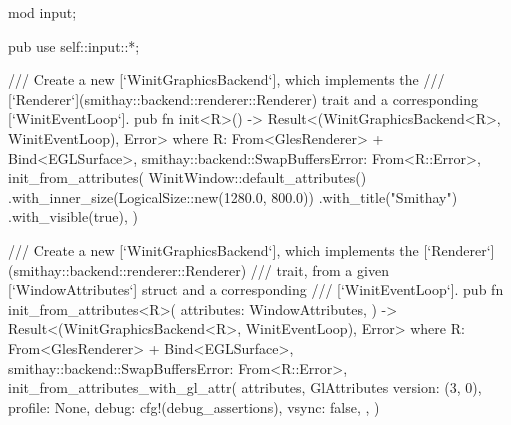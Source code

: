 mod input;

pub use self::input::*;

/// Create a new [`WinitGraphicsBackend`], which implements the
/// [`Renderer`](smithay::backend::renderer::Renderer) trait and a corresponding [`WinitEventLoop`].
pub fn init<R>() -> Result<(WinitGraphicsBackend<R>, WinitEventLoop), Error>
where
    R: From<GlesRenderer> + Bind<EGLSurface>,
    smithay::backend::SwapBuffersError: From<R::Error>,
{
    init_from_attributes(
        WinitWindow::default_attributes()
            .with_inner_size(LogicalSize::new(1280.0, 800.0))
            .with_title("Smithay")
            .with_visible(true),
    )
}

/// Create a new [`WinitGraphicsBackend`], which implements the [`Renderer`](smithay::backend::renderer::Renderer)
/// trait, from a given [`WindowAttributes`] struct and a corresponding
/// [`WinitEventLoop`].
pub fn init_from_attributes<R>(
    attributes: WindowAttributes,
) -> Result<(WinitGraphicsBackend<R>, WinitEventLoop), Error>
where
    R: From<GlesRenderer> + Bind<EGLSurface>,
    smithay::backend::SwapBuffersError: From<R::Error>,
{
    init_from_attributes_with_gl_attr(
        attributes,
        GlAttributes {
            version: (3, 0),
            profile: None,
            debug: cfg!(debug_assertions),
            vsync: false,
        },
    )
}

